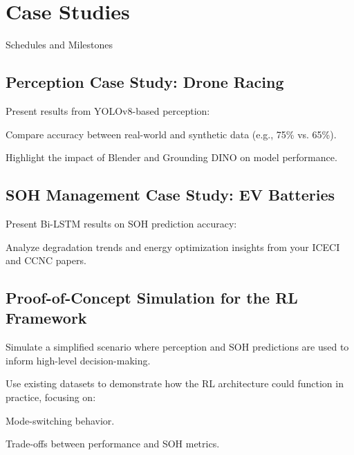 \chapter{Case Studies}\label{ch:5}
\minitoc

Schedules and Milestones

\newpage

\section{Perception Case Study: Drone Racing}

Present results from YOLOv8-based perception:

Compare accuracy between real-world and synthetic data (e.g., 75\% vs. 65\%).

Highlight the impact of Blender and Grounding DINO on model performance.


\section{SOH Management Case Study: EV Batteries}

Present Bi-LSTM results on SOH prediction accuracy:

Analyze degradation trends and energy optimization insights from your ICECI and CCNC papers.


\section{Proof-of-Concept Simulation for the RL Framework}

Simulate a simplified scenario where perception and SOH predictions are used to inform high-level decision-making.

Use existing datasets to demonstrate how the RL architecture could function in practice, focusing on:

Mode-switching behavior.

Trade-offs between performance and SOH metrics.

\endinput